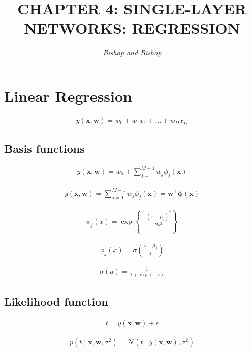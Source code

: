 \documentclass{article}
\title{\LARGE\scshape\MakeUppercase{Chapter 4: Single-layer Networks: Regression}}
\author{\textit{Bishop and Bishop}}
\date{}
\begin{document}
\maketitle

\section{Linear Regression}

\begin{align*}
y(\mathbf{x}, \mathbf{w})=w_{0}+w_{1} x_{1}+\ldots+w_{D} x_{D}
\tag{4.1}
\end{align*}

\subsection{Basis functions}

\begin{align*}
y(\mathbf{x}, \mathbf{w}) = w_0 + \sum_{j=1}^{M-1} w_j \phi_j(\mathbf{x})
\tag{4.2}
\end{align*}

\begin{align*}
y(\mathbf{x}, \mathbf{w}) = \sum_{j=0}^{M-1} w_j \phi_j(\mathbf{x}) = \mathbf{w}^{\top} \boldsymbol{\phi}(\mathbf{x})
\tag{4.3}
\end{align*}

\begin{align*}
\phi_j(x) = \exp \left\{ -\frac{(x - \mu_j)^2}{2 s^2} \right\}
\tag{4.4}
\end{align*}

\begin{align*}
\phi_j(x) = \sigma \left( \frac{x - \mu_j}{s} \right)
\tag{4.5}
\end{align*}

\begin{align*}
\sigma(a) = \frac{1}{1 + \exp(-a)}
\tag{4.6}
\end{align*}

\subsection{Likelihood function}

\begin{align*}
t = y(\mathbf{x}, \mathbf{w}) + \epsilon
\tag{4.7}
\end{align*}

\begin{align*}
p(t \mid \mathbf{x}, \mathbf{w}, \sigma^2) = \mathcal{N}(t \mid y(\mathbf{x}, \mathbf{w}), \sigma^2)
\tag{4.8}
\end{align*}
\end{document}
